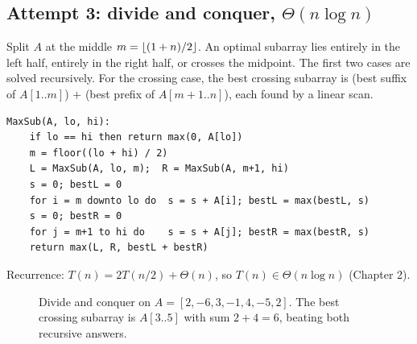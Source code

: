 \subsection{Attempt 3: divide and conquer, \texorpdfstring{$\Theta(n\log n)$}{Theta(n log n)}}
Split $A$ at the middle $m=\left\lfloor (1+n)/2 \right\rfloor$. An optimal subarray lies entirely in the left half,
entirely in the right half, or crosses the midpoint. The first two cases are solved
recursively. For the crossing case, the best crossing subarray is
(best suffix of $A[1..m]$) $+$ (best prefix of $A[m+1..n]$), each found by a linear scan.
\begin{lstlisting}[style=pseudo]
MaxSub(A, lo, hi):
    if lo == hi then return max(0, A[lo])
    m = floor((lo + hi) / 2)
    L = MaxSub(A, lo, m);  R = MaxSub(A, m+1, hi)
    s = 0; bestL = 0
    for i = m downto lo do  s = s + A[i]; bestL = max(bestL, s)
    s = 0; bestR = 0
    for j = m+1 to hi do    s = s + A[j]; bestR = max(bestR, s)
    return max(L, R, bestL + bestR)
\end{lstlisting}
Recurrence: $T(n)=2T(n/2)+\Theta(n)$, so $T(n)\in\Theta(n\log n)$ (Chapter 2).

\begin{figure}[H]
\centering
{}
\caption{Divide and conquer on $A=[2,-6,3,-1,4,-5,2]$. The best crossing
subarray is $A[3..5]$ with sum $2+4=6$, beating both recursive answers.}
\end{figure}

